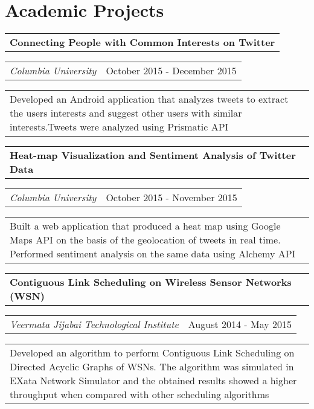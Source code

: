 \documentclass[margin,line]{res}
\begin{document}
\begin{resume}
\begin{tabular}{p{5.92in}}
\end{tabular}



\section{\sc \bf Academic Projects}

\begin{tabular}{p{5.92in}}
\bf Connecting People with Common Interests on Twitter\\
\end{tabular}
\begin{tabular} {p{3.88in} r}
\it Columbia University & October 2015 - December 2015
\end{tabular}
\begin{tabular} {p{5.92in}}
Developed an Android application that analyzes tweets to extract the users interests and suggest other users with similar interests.Tweets were analyzed using Prismatic API
\end{tabular}

\begin{tabular}{p{5.92in}}
\bf Heat-map Visualization and Sentiment Analysis of Twitter Data\\
\end{tabular}
\begin{tabular}{p{3.87in} r}
\it Columbia University & October 2015 - November 2015
\end{tabular}
\begin{tabular}{p{5.92in}}
Built a web application that produced a heat map using Google Maps API on the basis of the geolocation of tweets in real time. Performed sentiment analysis on the same data using Alchemy API 


\end{tabular}

\begin {tabular} {p{5.92in}}
\bf Contiguous Link Scheduling on Wireless Sensor Networks (WSN)\\
\end{tabular}
\begin{tabular} {p{4.27in} r}
\it Veermata Jijabai Technological Institute & August 2014 - May 2015
\end{tabular}
\begin{tabular} {p{5.92in}}
Developed an algorithm to perform Contiguous Link Scheduling on Directed Acyclic Graphs of WSNs. The algorithm was simulated in EXata Network Simulator and the obtained results showed a higher throughput when compared with other scheduling algorithms 
\end{tabular}


\end{resume}
\end{document}
